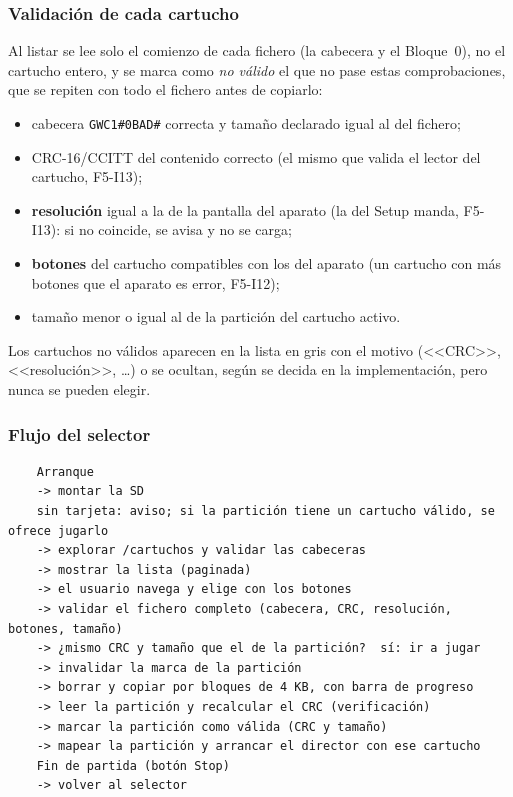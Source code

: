\subsubsection{Validación de cada cartucho}

Al listar se lee solo el comienzo de cada fichero (la cabecera y el Bloque~0), no el cartucho entero, y se marca como \emph{no válido} el que no pase estas comprobaciones, que se repiten con todo el fichero antes de copiarlo:

\begin{itemize}
	\item cabecera \texttt{GWC1\#0BAD\#} correcta y tamaño declarado igual al del fichero;
	\item CRC-16/CCITT del contenido correcto (el mismo que valida el lector del cartucho, F5-I13);
	\item \textbf{resolución} igual a la de la pantalla del aparato (la del Setup manda, F5-I13): si no coincide, se avisa y no se carga;
	\item \textbf{botones} del cartucho compatibles con los del aparato (un cartucho con más botones que el aparato es error, F5-I12);
	\item tamaño menor o igual al de la partición del cartucho activo.
\end{itemize}

Los cartuchos no válidos aparecen en la lista en gris con el motivo (<<CRC>>, <<resolución>>, \ldots) o se ocultan, según se decida en la implementación, pero nunca se pueden elegir.

\subsubsection{Flujo del selector}

\begin{verbatim}
	Arranque
	-> montar la SD
	sin tarjeta: aviso; si la partición tiene un cartucho válido, se ofrece jugarlo
	-> explorar /cartuchos y validar las cabeceras
	-> mostrar la lista (paginada)
	-> el usuario navega y elige con los botones
	-> validar el fichero completo (cabecera, CRC, resolución, botones, tamaño)
	-> ¿mismo CRC y tamaño que el de la partición?  sí: ir a jugar
	-> invalidar la marca de la partición
	-> borrar y copiar por bloques de 4 KB, con barra de progreso
	-> leer la partición y recalcular el CRC (verificación)
	-> marcar la partición como válida (CRC y tamaño) 
	-> mapear la partición y arrancar el director con ese cartucho
	Fin de partida (botón Stop)
	-> volver al selector
\end{verbatim}

